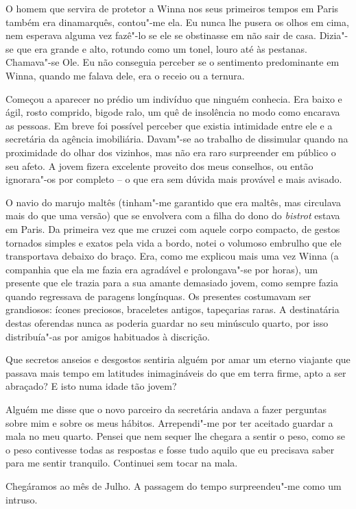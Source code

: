 O homem que servira de protetor a Winna nos seus primeiros tempos em
Paris também era dinamarquês, contou"-me ela. Eu nunca lhe pusera os olhos em cima, nem esperava alguma vez
fazê"-lo se ele se obstinasse em não sair de casa. Dizia"-se que era
grande e alto, rotundo como um tonel, louro até às pestanas. Chamava"-se
Ole. Eu não conseguia perceber se o sentimento predominante em Winna,
quando me falava dele, era o receio ou a ternura.

Começou a aparecer no prédio um indivíduo que ninguém conhecia. Era
baixo e ágil, rosto comprido, bigode ralo, um quê de insolência no modo
como encarava as pessoas. Em breve foi possível perceber que existia
intimidade entre ele e
a secretária da agência imobiliária. Davam"-se ao trabalho de dissimular
quando na proximidade do olhar dos vizinhos, mas não era raro
surpreender em público o seu afeto. A jovem fizera excelente proveito
dos meus conselhos, ou então ignorara"-os por completo -- o que era sem
dúvida mais provável e mais avisado.

O navio do marujo maltês (tinham"-me garantido que era maltês, mas
circulava mais do que uma versão) que se envolvera com a filha do dono
do \emph{bistrot }estava em Paris. Da primeira vez que me cruzei com
aquele corpo compacto, de gestos tornados simples e exatos pela vida
a bordo, notei o volumoso embrulho que ele transportava debaixo do
braço. Era, como me explicou mais uma vez Winna (a companhia que ela me
fazia era agradável e prolongava"-se por horas), um presente que ele
trazia para a sua amante demasiado jovem, como sempre fazia quando
regressava de paragens longínquas. Os presentes costumavam ser
grandiosos: ícones preciosos, braceletes antigos, tapeçarias raras. A
destinatária destas oferendas nunca as poderia guardar no seu minúsculo
quarto, por isso distribuía"-as por amigos habituados à discrição.

Que secretos anseios e desgostos sentiria alguém por amar um eterno
viajante que passava mais tempo em latitudes inimagináveis do que em
terra firme, apto a ser abraçado? E isto numa idade tão jovem?

Alguém me disse que o novo parceiro da secretária andava a fazer
perguntas sobre mim e sobre os meus hábitos. Arrependi"-me por ter
aceitado guardar a mala no meu quarto. Pensei que nem sequer lhe chegara
a sentir o peso, como se o peso contivesse todas as respostas e fosse
tudo aquilo que eu precisava saber para me sentir tranquilo. Continuei
sem tocar na mala.

Chegáramos ao mês de Julho. A passagem do tempo surpreendeu"-me como um
intruso.


